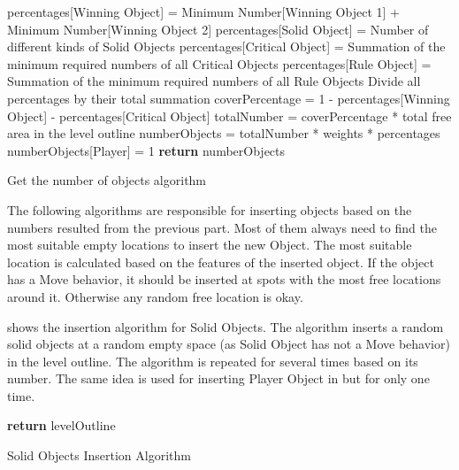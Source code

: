 \begin{algorithm}[H]
	\BlankLine
	percentages[Winning Object] = Minimum Number[Winning Object 1] + Minimum Number[Winning Object 2]\;
	percentages[Solid Object] = Number of different kinds of Solid Objects\;
	percentages[Critical Object] = Summation of the minimum required numbers of all Critical Objects\;
	percentages[Rule Object] = Summation of the minimum required numbers of all Rule Objects\;
	Divide all percentages by their total summation\;
	\BlankLine
	coverPercentage = 1 - percentages[Winning Object] - percentages[Critical Object]\;
	totalNumber = coverPercentage * total free area in the level outline\;
	numberObjects = totalNumber * weights * percentages\;
	numberObjects[Player] = 1\;
	\BlankLine
	\textbf{return} numberObjects\;
	\caption{Get the number of objects algorithm}
	\label{Algorithm:numberObjects}
\end{algorithm}

The following algorithms are responsible for inserting objects based on the numbers resulted from the previous part. Most of them always need to find the most suitable empty locations to insert the new Object. The most suitable location is calculated based on the features of the inserted object. If the object has a Move behavior, it should be inserted at spots with the most free locations around it. Otherwise any random free location is okay.\\\par

 shows the insertion algorithm for Solid Objects. The algorithm inserts a random solid objects at a random empty space (as Solid Object has not a Move behavior) in the level outline. The algorithm is repeated for several times based on its number. The same idea is used for inserting Player Object in  but for only one time.\\

\begin{algorithm}[H]
	\BlankLine
	\BlankLine
	\textbf{return} levelOutline\;
	\caption{Solid Objects Insertion Algorithm}
	\label{Algorithm:solidObjects}
\end{algorithm}

